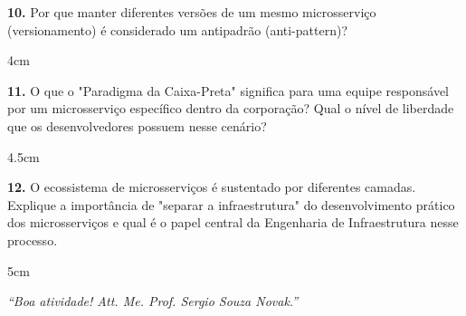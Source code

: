 \documentclass[12pt]{article}
\begin{document}
\vspace{0.5cm}

\textbf{10.} Por que manter diferentes versões de um mesmo microsserviço (versionamento) é considerado um antipadrão (anti-pattern)?
\begin{resposta}{4cm}
\end{resposta}

\vspace{0.5cm}

\textbf{11.} O que o "Paradigma da Caixa-Preta" significa para uma equipe responsável por um microsserviço específico dentro da corporação? Qual o nível de liberdade que os desenvolvedores possuem nesse cenário?
\begin{resposta}{4.5cm}
\end{resposta}

\vspace{0.5cm}

\textbf{12.} O ecossistema de microsserviços é sustentado por diferentes camadas. Explique a importância de "separar a infraestrutura" do desenvolvimento prático dos microsserviços e qual é o papel central da Engenharia de Infraestrutura nesse processo.
\begin{resposta}{5cm}
\end{resposta}

\vspace{0.8cm}

\begin{center}
  \textit{``Boa atividade! Att. Me. Prof. Sergio Souza Novak.''}
\end{center}

\end{document}
